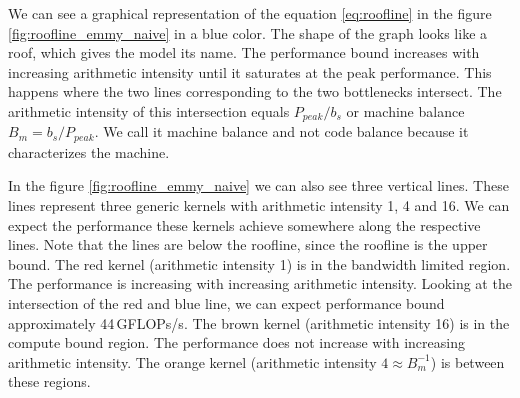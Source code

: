 We can see a graphical representation of the equation \ref{eq:roofline} in the figure \ref{fig:roofline_emmy_naive} in a blue color. The shape of the graph looks like a roof, which gives the model its name.
The performance bound increases with increasing arithmetic intensity until it saturates at the peak performance. This happens where the two lines corresponding to the two bottlenecks intersect. The arithmetic intensity of this intersection equals $P_{peak}/b_s$ or machine balance $B_m=b_s/P_{peak}$. We call it machine balance and not code balance because it characterizes the machine.

In the figure \ref{fig:roofline_emmy_naive} we can also see three vertical lines. These lines represent three generic kernels with arithmetic intensity 1, 4 and 16. We can expect the performance these kernels achieve somewhere along the respective lines.
Note that the lines are below the roofline, since the roofline is the upper bound.
The red kernel (arithmetic intensity 1) is in the bandwidth limited region. The performance is increasing with increasing arithmetic intensity. Looking at the intersection of the red and blue line, we can expect performance bound approximately 44\,GFLOPs/s.
The brown kernel (arithmetic intensity 16) is in the compute bound region. The performance does not increase with increasing arithmetic intensity.
The orange kernel (arithmetic intensity $4 \approx B_m^{-1}$) is between these regions. \todol{}



